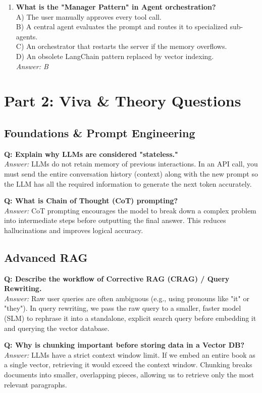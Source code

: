 \documentclass[12pt,a4paper]{article}
\begin{document}
\begin{enumerate}
    \item \textbf{What is the "Manager Pattern" in Agent orchestration?} \\
    A) The user manually approves every tool call. \\
    B) A central agent evaluates the prompt and routes it to specialized sub-agents. \\
    C) An orchestrator that restarts the server if the memory overflows. \\
    D) An obsolete LangChain pattern replaced by vector indexing. \\
    \textit{Answer: B}
\end{enumerate}

\section{Part 2: Viva \& Theory Questions}

\subsection{Foundations \& Prompt Engineering}
\textbf{Q: Explain why LLMs are considered "stateless."} \\
\textit{Answer:} LLMs do not retain memory of previous interactions. In an API call, you must send the entire conversation history (context) along with the new prompt so the LLM has all the required information to generate the next token accurately.

\textbf{Q: What is Chain of Thought (CoT) prompting?} \\
\textit{Answer:} CoT prompting encourages the model to break down a complex problem into intermediate steps before outputting the final answer. This reduces hallucinations and improves logical accuracy.

\subsection{Advanced RAG}
\textbf{Q: Describe the workflow of Corrective RAG (CRAG) / Query Rewriting.} \\
\textit{Answer:} Raw user queries are often ambiguous (e.g., using pronouns like "it" or "they"). In query rewriting, we pass the raw query to a smaller, faster model (SLM) to rephrase it into a standalone, explicit search query before embedding it and querying the vector database.

\textbf{Q: Why is chunking important before storing data in a Vector DB?} \\
\textit{Answer:} LLMs have a strict context window limit. If we embed an entire book as a single vector, retrieving it would exceed the context window. Chunking breaks documents into smaller, overlapping pieces, allowing us to retrieve only the most relevant paragraphs.
\end{document}
